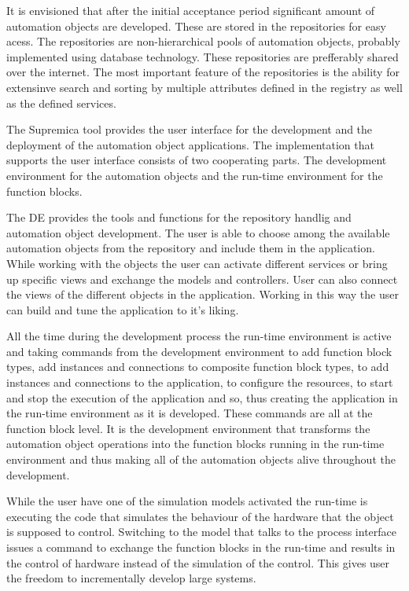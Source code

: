 It is envisioned that after the initial acceptance period
significant amount of automation objects are developed.
These are stored in the repositories for easy acess. The
repositories are non-hierarchical pools of automation
objects, probably implemented using database technology.
These repositories are prefferably shared over the internet.
The most important feature of the repositories is the
ability for extensinve search and sorting by multiple
attributes defined in the registry as well as the defined
services.

The Supremica tool provides the user interface for the
development and the deployment of the automation object
applications. The implementation that supports the user
interface consists of two cooperating parts. The development
environment for the automation objects and the run-time
environment for the function blocks. 

The DE provides the tools and functions for the repository
handlig and automation object development. The user is able
to choose among the available automation objects from the
repository and include them in the application. While
working with the objects the user can activate different
services or bring up specific views and exchange the models
and controllers. User can also connect the views of the
different objects in the application. Working in this way
the user can build and tune the application to it's liking.

All the time during the development process the run-time
environment is active and taking commands from the
development environment to add function block types, add
instances and connections to composite function block types,
to add instances and connections to the application, to
configure the resources, to start and stop the execution of
the application and so, thus creating the application in the
run-time environment as it is developed. These commands are
all at the function block level. It is the development
environment that transforms the automation object operations
into the function blocks running in the run-time environment
and thus making all of the automation objects alive
throughout the development.

While the user have one of the simulation models activated
the run-time is executing the code that simulates the
behaviour of the hardware that the object is supposed to
control. Switching to the model that talks to the process
interface issues a command to exchange the function blocks
in the run-time and results in the control of hardware
instead of the simulation of the control. This gives user
the freedom to incrementally develop large systems. 

